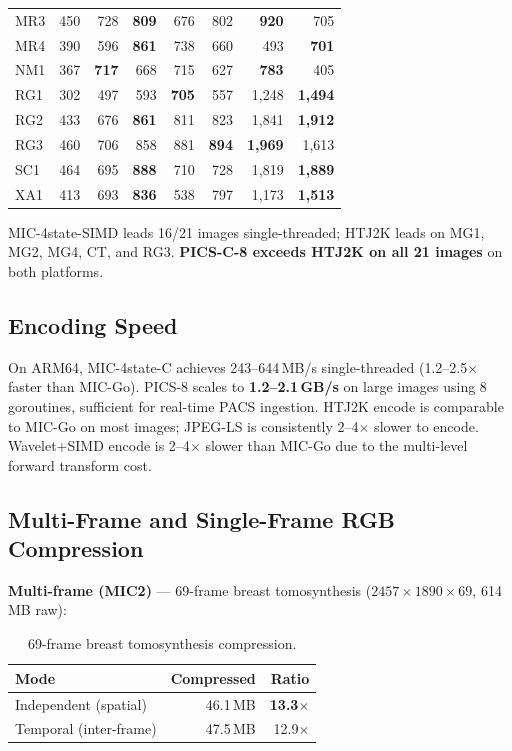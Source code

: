 \documentclass[journal]{IEEEtran}
\begin{document}
\begin{table}[t]
\begin{tabular}{lrrrrrrr}
MR3  & 450 & 728 & \textbf{809} & 676 & 802 & \textbf{920} & 705 \\
MR4  & 390 & 596 & \textbf{861} & 738 & 660 & 493 & \textbf{701} \\
NM1  & 367 & \textbf{717} & 668 & 715 & 627 & \textbf{783} & 405 \\
RG1  & 302 & 497 & 593 & \textbf{705} & 557 & 1,248 & \textbf{1,494} \\
RG2  & 433 & 676 & \textbf{861} & 811 & 823 & 1,841 & \textbf{1,912} \\
RG3  & 460 & 706 & 858 & 881 & \textbf{894} & \textbf{1,969} & 1,613 \\
SC1  & 464 & 695 & \textbf{888} & 710 & 728 & 1,819 & \textbf{1,889} \\
XA1  & 413 & 693 & \textbf{836} & 538 & 797 & 1,173 & \textbf{1,513} \\
\bottomrule
\end{tabular}
\end{table}

MIC-4state-SIMD leads 16/21 images single-threaded; HTJ2K leads on MG1, MG2,
MG4, CT, and RG3. \textbf{PICS-C-8 exceeds HTJ2K on all 21 images} on both
platforms.

\subsection{Encoding Speed}

On ARM64, MIC-4state-C achieves 243--644\,MB/s single-threaded (1.2--2.5$\times$
faster than MIC-Go). PICS-8 scales to \textbf{1.2--2.1\,GB/s} on large images
using 8 goroutines, sufficient for real-time PACS ingestion. HTJ2K encode is
comparable to MIC-Go on most images; JPEG-LS is consistently 2--4$\times$ slower
to encode. Wavelet+SIMD encode is 2--4$\times$ slower than MIC-Go due to the
multi-level forward transform cost.

\subsection{Multi-Frame and Single-Frame RGB Compression}

\textbf{Multi-frame (MIC2)} --- 69-frame breast tomosynthesis ($2457 \times
1890 \times 69$, 614\,MB raw):

\begin{table}[htbp]
\centering
\caption{69-frame breast tomosynthesis compression.}
\label{tab:multiframe}
\begin{tabular}{lrr}
\toprule
Mode & Compressed & Ratio \\
\midrule
Independent (spatial) & 46.1\,MB & \textbf{13.3$\times$} \\
Temporal (inter-frame) & 47.5\,MB & 12.9$\times$ \\
\bottomrule
\end{tabular}
\end{table}
\end{document}
